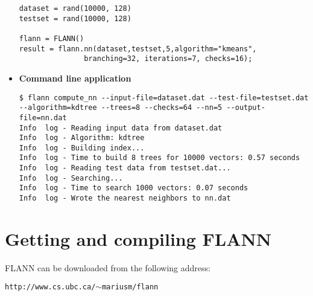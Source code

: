 \documentclass[letter,10pt]{article}
\begin{document}
\begin{itemize}
\begin{Verbatim}[fontsize=\scriptsize,frame=single]
dataset = rand(10000, 128)
testset = rand(10000, 128)

flann = FLANN()
result = flann.nn(dataset,testset,5,algorithm="kmeans",
               branching=32, iterations=7, checks=16);
\end{Verbatim}

\item \textbf{Command line application}



\begin{Verbatim}[fontsize=\scriptsize,frame=single]
$ flann compute_nn --input-file=dataset.dat --test-file=testset.dat 
--algorithm=kdtree --trees=8 --checks=64 --nn=5 --output-file=nn.dat
Info  log - Reading input data from dataset.dat
Info  log - Algorithm: kdtree
Info  log - Building index...
Info  log - Time to build 8 trees for 10000 vectors: 0.57 seconds
Info  log - Reading test data from testset.dat...
Info  log - Searching...
Info  log - Time to search 1000 vectors: 0.07 seconds
Info  log - Wrote the nearest neighbors to nn.dat
\end{Verbatim}

\end{itemize}



\section{Getting and compiling FLANN}

FLANN can be downloaded from the following address:
\begin{center}
\texttt{http://www.cs.ubc.ca/$\sim$mariusm/flann}
\end{center}
\end{document}
